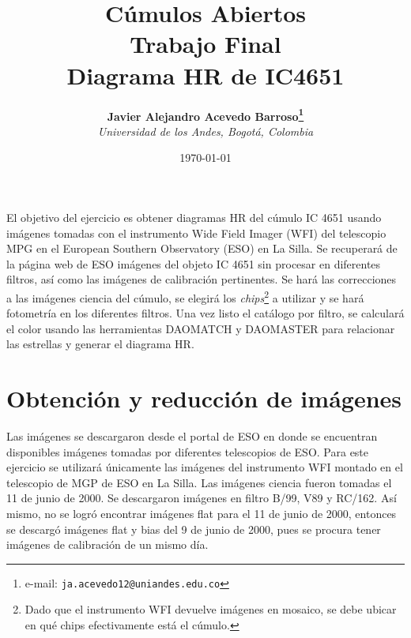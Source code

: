 \documentclass[12pt]{article}
\begin{document}
\title{Cúmulos Abiertos \\ Trabajo Final \\ Diagrama HR de IC4651}

\author{
\textbf{Javier Alejandro Acevedo Barroso\thanks{e-mail: \texttt{ja.acevedo12@uniandes.edu.co}}}\\
\textit{Universidad de los Andes, Bogotá, Colombia}\\
 }%

\date{\today}
\maketitle %


\normalsize
\newpage

El objetivo del ejercicio es obtener diagramas HR del cúmulo IC 4651 usando imágenes tomadas con el instrumento Wide Field Imager (WFI) del telescopio MPG en el European Southern Observatory (ESO) en La Silla.
Se recuperará de la página web de ESO imágenes del objeto IC 4651 sin procesar en diferentes filtros, así como las imágenes de calibración pertinentes. 
Se hará las correcciones a las imágenes ciencia del cúmulo, se elegirá los \emph{chips}\footnote{Dado que el instrumento WFI devuelve imágenes en mosaico, se debe ubicar en qué chips efectivamente está el cúmulo.} a utilizar y se hará fotometría en los diferentes filtros.
Una vez listo el catálogo por filtro, se calculará el color usando las herramientas DAOMATCH y DAOMASTER para relacionar las estrellas y generar el diagrama HR.


\section{Obtención y reducción de imágenes}
Las imágenes se descargaron desde el portal de ESO en donde se encuentran disponibles imágenes tomadas por diferentes telescopios de ESO. Para este ejercicio se utilizará únicamente las imágenes del instrumento WFI montado en el telescopio de MGP de ESO en La Silla. Las imágenes ciencia fueron tomadas el 11 de junio de 2000. Se descargaron imágenes en filtro B/99, V89 y RC/162. Así mismo, no se logró encontrar imágenes flat para el 11 de junio de 2000, entonces se descargó imágenes flat y bias del 9 de junio de 2000, pues se procura tener imágenes de calibración de un mismo día.
\end{document}
